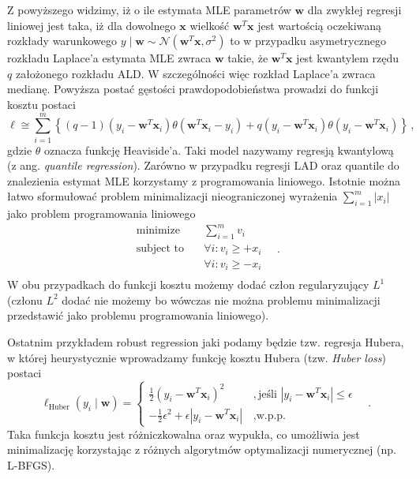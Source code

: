 \documentclass{myclass}
\begin{document}
Z powyższego widzimy, iż o ile estymata MLE parametrów \(\mathbf{w}\) dla zwykłej regresji liniowej
jest taka, iż dla dowolnego \(\mathbf{x}\) wielkość \(\mathbf{w}^T\mathbf{x}\) jest wartością
oczekiwaną rozkłady warunkowego \(y \mid \mathbf{w} \sim \mathcal{N}(\mathbf{w}^T\mathbf{x},
\sigma^2)\) to w przypadku asymetrycznego rozkładu Laplace'a estymata MLE zwraca \(\mathbf{w}\)
takie, że \(\mathbf{w}^T\mathbf{x}\) jest kwantylem rzędu \(q\) założonego rozkładu ALD. W
szczególności więc rozkład Laplace'a zwraca medianę. Powyższa postać gęstości prawdopodobieństwa
prowadzi do funkcji kosztu postaci
\begin{equation*}
    \ell \cong \sum_{i=1}^m \left\{(q-1)(y_i - \mathbf{w}^T\mathbf{x}_i) \theta(\mathbf{w}^T\mathbf{x}_i - y_i) + q (y_i - \mathbf{w}^T\mathbf{x}_i)\theta(y_i - \mathbf{w}^T\mathbf{x}_i)\right\}\,,
\end{equation*}
gdzie \(\theta\) oznacza funkcję Heaviside'a. Taki model nazywamy regresją kwantylową (z ang.
\textit{quantile regression}). Zarówno w przypadku regresji LAD oraz quantile do znalezienia estymat
MLE korzystamy z programowania liniowego. Istotnie można łatwo sformułować problem minimalizacji
nieograniczonej wyrażenia \(\sum_{i=1}^m |x_i|\) jako problem programowania liniowego
\begin{equation*}
    \begin{split}
        \text{minimize}   &\quad \sum_{i=1}^m v_i\\
        \text{subject to} &\quad \forall i : v_i \geq +x_i\\
                          &\quad \forall i : v_i \geq -x_i\\
    \end{split}\quad.
\end{equation*}
W obu przypadkach do funkcji kosztu możemy dodać człon regularyzujący \(L^1\) (członu \(L^2\) dodać
nie możemy bo wówczas nie można problemu minimalizacji przedstawić jako problemu programowania
liniowego).

Ostatnim przykładem robust regression jaki podamy będzie tzw. regresja Hubera, w której
heurystycznie wprowadzamy funkcję kosztu Hubera (tzw. \textit{Huber loss}) postaci
\begin{equation*}
    \ell_\text{Huber}(y_i \mid \mathbf{w}) = \begin{cases}
        \frac{1}{2}(y_i - \mathbf{w}^T\mathbf{x}_i)^2&\,,\text{jeśli \(|y_i - \mathbf{w}^T\mathbf{x}_i| \leq \epsilon\)}\\
        -\frac{1}{2}\epsilon^2 + \epsilon|y_i - \mathbf{w}^T\mathbf{x}_i|&\,,\text{w.p.p.}
    \end{cases}\quad.
\end{equation*}
Taka funkcja kosztu jest różniczkowalna oraz wypukła, co umożliwia jest minimalizację korzystając z
różnych algorytmów optymalizacji numerycznej (np. L-BFGS).
\end{document}
